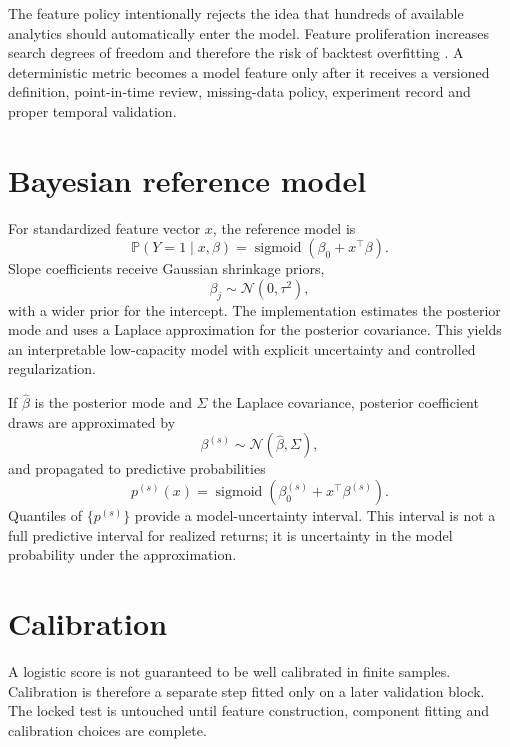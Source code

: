 \documentclass[11pt]{article}
\newcommand{\Prb}{\mathbb{P}}
\newcommand{\sigmoid}{\operatorname{sigmoid}}
\begin{document}
The feature policy intentionally rejects the idea that hundreds of available analytics should automatically enter the model. Feature proliferation increases search degrees of freedom and therefore the risk of backtest overfitting \citep{white2000reality,harvey2016crosssection,bailey2017pbo}. A deterministic metric becomes a model feature only after it receives a versioned definition, point-in-time review, missing-data policy, experiment record and proper temporal validation.

\section{Bayesian reference model}
For standardized feature vector $x$, the reference model is
\begin{equation}
\Prb(Y=1\mid x,\beta)=\sigmoid(\beta_0+x^\top\beta).
\end{equation}
Slope coefficients receive Gaussian shrinkage priors,
\begin{equation}
\beta_j\sim\mathcal{N}(0,\tau^2),
\end{equation}
with a wider prior for the intercept. The implementation estimates the posterior mode and uses a Laplace approximation for the posterior covariance. This yields an interpretable low-capacity model with explicit uncertainty and controlled regularization.

If $\hat\beta$ is the posterior mode and $\Sigma$ the Laplace covariance, posterior coefficient draws are approximated by
\begin{equation}
\beta^{(s)}\sim\mathcal{N}(\hat\beta,\Sigma),
\end{equation}
and propagated to predictive probabilities
\begin{equation}
p^{(s)}(x)=\sigmoid(\beta_0^{(s)}+x^\top\beta^{(s)}).
\end{equation}
Quantiles of $\{p^{(s)}\}$ provide a model-uncertainty interval. This interval is not a full predictive interval for realized returns; it is uncertainty in the model probability under the approximation.

\section{Calibration}
A logistic score is not guaranteed to be well calibrated in finite samples. Calibration is therefore a separate step fitted only on a later validation block. The locked test is untouched until feature construction, component fitting and calibration choices are complete.
\end{document}
